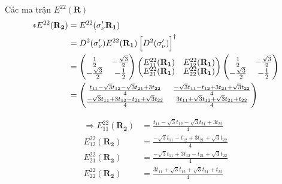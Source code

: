 \documentclass{article}
\begin{document}
Các ma trận $E^{22}(\mathbf{R})$
\begin{align*}
	\ast E^{22} (\mathbf{R_2})
	 & =  E^{22} (\sigma'_\nu \mathbf{R_1})                                             \\
	 & = D^2(\sigma'_\nu)  E^{22}(\mathbf{R_1}) \left[ D^2(\sigma'_\nu) \right]^\dagger \\
	 &
	=
	\begin{pmatrix}
		\renewcommand{\arraystretch}{0.72}
		\frac{1}{2}         & -\frac{\sqrt{3}}{2} \\
		-\frac{\sqrt{3}}{2} & -\frac{1}{2}
	\end{pmatrix}
	\begin{pmatrix}
		E_{11}^{22}(\mathbf{R_1}) & E_{12}^{22}(\mathbf{R_1}) \\
		E_{21}^{22}(\mathbf{R_1}) & E_{22}^{22}(\mathbf{R_1})
	\end{pmatrix}
	\begin{pmatrix}
		\frac{1}{2}         & -\frac{\sqrt{3}}{2} \\
		-\frac{\sqrt{3}}{2} & -\frac{1}{2}
	\end{pmatrix}                            \\
	 & =
	\begin{pmatrix}
		\frac{t_{11} - \sqrt{3}t_{12} - \sqrt{3}t_{21} + 3t_{22}}{4}  & \frac{-\sqrt{3}t_{11} - t_{12} + 3t_{21} + \sqrt{3}t_{22}}{4} \\
		\frac{-\sqrt{3}t_{11} + 3t_{12} - t_{21} + \sqrt{3}t_{22}}{4} & \frac{3t_{11} + \sqrt{3}t_{12} + \sqrt{3}t_{21} + t_{22}}{4}
	\end{pmatrix}
\end{align*}

\begin{align*}
	\Rightarrow E_{11}^{22}(\mathbf{R_2}) & = \frac{t_{11} - \sqrt{3}t_{12} - \sqrt{3}t_{21} + 3t_{22}}{4}  \\
	E_{12}^{22}(\mathbf{R_2})             & = \frac{-\sqrt{3}t_{11} - t_{12} + 3t_{21} + \sqrt{3}t_{22}}{4} \\
	E_{21}^{22}(\mathbf{R_2})             & = \frac{-\sqrt{3}t_{11} + 3t_{12} - t_{21} + \sqrt{3}t_{22}}{4} \\
	E_{22}^{22}(\mathbf{R_2})             & = \frac{3t_{11} + \sqrt{3}t_{12} + \sqrt{3}t_{21} + t_{22}}{4}  \\
\end{align*}
\end{document}
